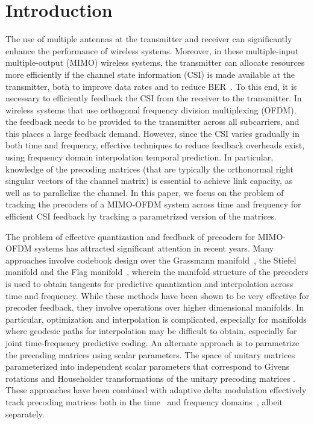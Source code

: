 \documentclass[journal,10pt,twocolumn]{IEEEtran}
\begin{document}
\section{Introduction}
\label{intro}

The use of multiple antennas at the transmitter and receiver can
significantly enhance the performance of wireless systems. Moreover,
in these multiple-input multiple-output (MIMO) wireless systems, the
transmitter can allocate resources more efficiently if the channel
state information (CSI) is made available at the transmitter, both to
improve data rates and to reduce BER~\cite{love2008overview}. To this
end, it is necessary to efficiently feedback the CSI from the receiver 
to the transmitter. In wireless systems that use orthogonal
frequency division multiplexing (OFDM), the feedback needs to be
provided to the transmitter across all subcarriers, and this places a
large feedback demand. However, since the CSI varies gradually in both
time and frequency, effective techniques to reduce feedback overheads
exist, using frequency domain interpolation temporal prediction. In
particular, knowledge of the precoding matrices (that are typically
the orthonormal right singular vectors of the channel matrix) is
essential to achieve link capacity, as well as to parallelize the
channel. In this paper, we focus on the problem of tracking the
precoders of a MIMO-OFDM system across time and frequency for
efficient CSI feedback by tracking a parametrized version of the matrices.

The problem of effective quantization and feedback of precoders for
MIMO-OFDM systems has attracted significant attention in recent
years. Many approaches involve codebook design over the Grassmann
manifold~\cite{mondal2007quantization,schwarz2013adaptive,5946308},
the Stiefel manifold \cite{6891198,Gupt1905:Predictive} and the Flag
manifold~\cite{pitaval2013codebooks}, wherein the manifold structure
of the precoders is used to obtain tangents for predictive
quantization and interpolation across time and frequency. While these
methods have been shown to be very effective for precoder feedback,
they involve operations over higher dimensional manifolds. In
particular, optimization and interpolation is complicated, especially
for manifolds where geodesic paths for interpolation may be difficult
to obtain, especially for joint time-frequency predictive coding. An
alternate approach is to parametrize the precoding matrices using
scalar parameters. The space of unitary matrices parameterized into
independent scalar parameters that correspond to Givens rotations and
Householder transformations of the unitary precoding matrices
\cite{4114278,4556174}. These approaches have been combined with
adaptive delta modulation effectively track precoding matrices both in
the time~\cite{4114278} and frequency domains~\cite{4556174}, albeit
separately.
\end{document}
